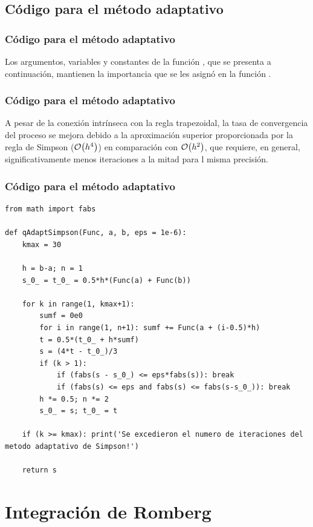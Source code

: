 \subsection*{Código para el método adaptativo}
\begin{frame}
\frametitle{Código para el método adaptativo}
Los argumentos, variables y constantes de la función , que se presenta a continuación, mantienen la importancia que se les asignó en la función .
\end{frame}
\begin{frame}
\frametitle{Código para el método adaptativo}
A pesar de la conexión intrínseca con la regla trapezoidal, la tasa de convergencia del proceso se mejora debido a la aproximación superior proporcionada por la regla de Simpson ($\order{h^{4}}$) en comparación con $\order{h^{2}}$, que requiere, en general, significativamente menos iteraciones a la mitad para l misma precisión.
\end{frame}
\begin{frame}
\frametitle{Código para el método adaptativo}
\begin{lstlisting}[caption=Código para el método adaptativo de Simpson, style=FormattedNumber, basicstyle=\linespread{1.1}\ttfamily=\small, columns=fullflexible]
from math import fabs

def qAdaptSimpson(Func, a, b, eps = 1e-6):
    kmax = 30

    h = b-a; n = 1
    s_0_ = t_0_ = 0.5*h*(Func(a) + Func(b))

    for k in range(1, kmax+1):
        sumf = 0e0
        for i in range(1, n+1): sumf += Func(a + (i-0.5)*h)
        t = 0.5*(t_0_ + h*sumf)
        s = (4*t - t_0_)/3
        if (k > 1):
            if (fabs(s - s_0_) <= eps*fabs(s)): break
            if (fabs(s) <= eps and fabs(s) <= fabs(s-s_0_)): break
        h *= 0.5; n *= 2
        s_0_ = s; t_0_ = t

    if (k >= kmax): print('Se excedieron el numero de iteraciones del metodo adaptativo de Simpson!')

    return s
\end{lstlisting}
\end{frame}
\section{Integración de Romberg}
